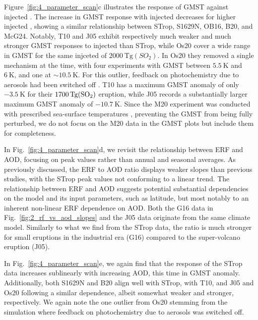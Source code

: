 \documentclass[draft]{agujournal2019}
\begin{document}
  Figure~\ref{fig:4_parameter_scan}c illustrates the response of GMST against injected
  . The increase in GMST response with injected  decreases for higher
  injected , showing a similar relationship between STrop, S1629N, OB16, B20,
  and McG24. Notably, T10 and J05 exhibit respectively much weaker and much stronger
  GMST responses to injected  than STrop, while Os20 cover a wide range in GMST
  for the same injceted  of \(\SI{2000}{\tera\gram(SO_{2})}\). In Os20 they
  removed a single mechanism at the time, with four experiments with GMST between
  \(\SI{5.5}{\kelvin}\) and \(\SI{6}{\kelvin}\), and one at \(\sim \SI{10.5}{\kelvin}\).
  For this outlier, feedback on photochemistry due to aerosols had been switched off
  \cite{osipov2020}. T10 has a maximum GMST anomaly of only \(\SI{-3.5}{\kelvin}\) for
  their \(\SI{1700}{\tera\gram(\ce{SO2})}\) eruption, while J05 records a substantially
  larger maximum GMST anomaly of \(\SI{-10.7}{\kelvin}\). Since the M20 experiment was
  conducted with prescribed sea-surface temperatures \cite{marshall2020}, preventing the
  GMST from being fully perturbed, we do not focus on the M20
  data in the GMST plots but include them for completeness.

  In Fig.~\ref{fig:4_parameter_scan}d, we revisit the relationship between ERF and AOD,
  focusing on peak values rather than annual and seasonal averages. As previously
  discussed, the ERF to AOD ratio displays weaker slopes than previous studies, with the
  STrop peak values not conforming to a linear trend. The relationship between ERF and
  AOD suggests potential substantial dependencies on the model and its input parameters,
  such as latitude, but most notably to an inherent non-linear ERF dependence on AOD.
  Both the G16 data in Fig.~\ref{fig:2_rf_vs_aod_slopes} and the J05 data originate from
  the same climate model. Similarly to what we find from the STrop data, the ratio is
  much stronger for small eruptions in the industrial era (G16) compared to the
  super-volcano eruption (J05).

  In Fig.~\ref{fig:4_parameter_scan}e, we again find that the response of the STrop data
  increases sublinearly with increasing AOD, this time in GMST anomaly. Additionally,
  both S1629N and B20 align well with STrop, with T10, and J05 and Os20 following a
  similar dependence, albeit somewhat weaker and stronger, respectively. We again note
  the one outlier from Os20 stemming from the simulation where feedback on
  photochemistry due to aerosols was switched off.
\end{document}
